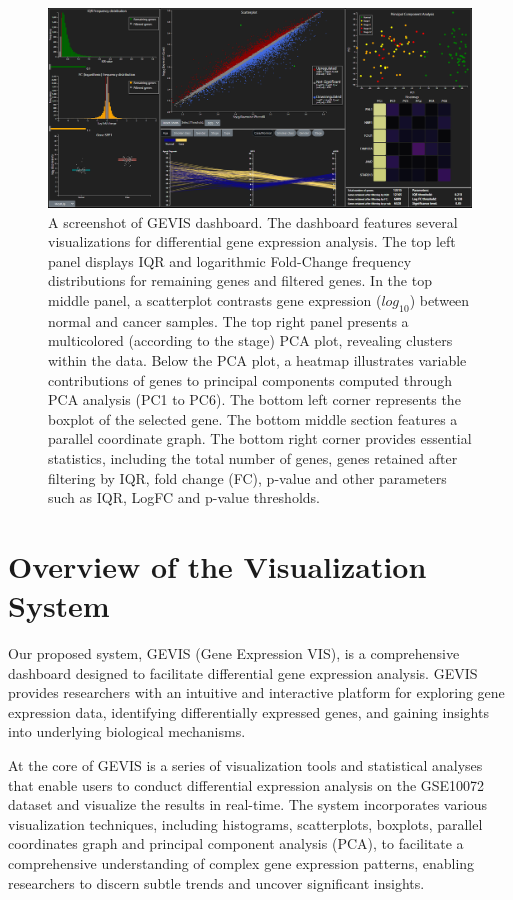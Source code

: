 \documentclass[
	a4paper, %
	10pt, %
	unnumberedsections, %
	twoside, %
]{LTJournalArticle}
\begin{document}
\begin{figure} %
	\includegraphics[width=\linewidth]{Figures/GEVIS Dashboard.png}
	\caption{A screenshot of GEVIS dashboard. The dashboard features several visualizations for differential gene expression analysis. The top left panel displays IQR and logarithmic Fold-Change frequency distributions for remaining genes and filtered genes. In the top middle panel, a scatterplot contrasts gene expression ($log_{10}$) between normal and cancer samples. The top right panel presents a multicolored (according to the stage) PCA plot, revealing clusters within the data. Below the PCA plot, a heatmap illustrates  variable contributions of genes to principal components computed through PCA analysis (PC1 to PC6). The bottom left corner represents the boxplot of the selected gene. The bottom middle section features a parallel coordinate graph. The bottom right corner provides essential statistics, including the total number of genes, genes retained after filtering by IQR, fold change (FC), p-value and other parameters such as IQR, LogFC and p-value thresholds.}
	\label{fig:gevis_dashboard}
\end{figure}


\section{Overview of the Visualization System}

Our proposed system, GEVIS (Gene Expression VIS), is a comprehensive dashboard designed to facilitate differential gene expression analysis. GEVIS provides researchers with an intuitive and interactive platform for exploring gene expression data, identifying differentially expressed genes, and gaining insights into underlying biological mechanisms.

At the core of GEVIS is a series of visualization tools and statistical analyses that enable users to conduct differential expression analysis on the GSE10072 dataset and visualize the results in real-time. The system incorporates various visualization techniques, including histograms, scatterplots, boxplots, parallel coordinates graph and principal component analysis (PCA), to facilitate a comprehensive understanding of complex gene expression patterns, enabling researchers to discern subtle trends and uncover significant insights.
\end{document}
